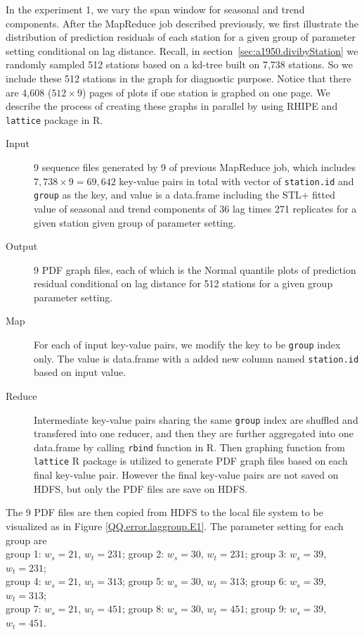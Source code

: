 In the experiment 1, we vary the span window for seasonal and trend components. 
After the MapReduce job described previously, we first illustrate the distribution
of prediction residuals of each station for a given group of parameter setting
conditional on lag distance. Recall, in section~\ref{sec:a1950.divibyStation} we
randomly sampled 512 stations based on a kd-tree built on 7,738 stations. So we 
include these 512 stations in the graph for diagnostic purpose. Notice that there
are 4,608 ($512 \times 9$) pages of plots if one station is graphed on one page.
We describe the process of creating these graphs in parallel by using RHIPE and 
\texttt{lattice} package in R.

\begin{description}
  \item[Input] 9 sequence files generated by 9 of previous MapReduce job, which 
  includes $7,738 \times 9 = 69,642$ key-value pairs in total with vector of 
  \texttt{station.id} and \texttt{group} as the key, and value is a data.frame 
  including the STL+ fitted value of seasonal and trend components of 36 lag 
  times 271 replicates for a given station given group of parameter setting.
  \item[Output] 9 PDF graph files, each of which is the Normal quantile plots of
  prediction residual conditional on lag distance for 512 stations for a given
  group parameter setting.  
  \item[Map] For each of input key-value pairs, we modify the key to be 
  \texttt{group} index only. The value is data.frame with a added new column 
  named \texttt{station.id} based on input value.
  \item[Reduce] Intermediate key-value pairs sharing the same \texttt{group} 
  index are shuffled and transfered into one reducer, and then they are further 
  aggregated into one data.frame by calling \texttt{rbind} 
  function in R. Then graphing function from \texttt{lattice} R package is utilized
  to generate PDF graph files based on each final key-value pair. However the 
  final key-value pairs are not saved on HDFS, but only the PDF files are save on
  HDFS. 
\end{description} 

The 9 PDF files are then copied from HDFS to the local file system to be 
visualized as in Figure {\ref{QQ.error.laggroup.E1}}. The parameter setting for
each group are
\\
group 1: $w_s = 21$, $w_t = 231$;
group 2: $w_s = 30$, $w_t = 231$;
group 3: $w_s = 39$, $w_t = 231$;\\
group 4: $w_s = 21$, $w_t = 313$;
group 5: $w_s = 30$, $w_t = 313$;
group 6: $w_s = 39$, $w_t = 313$;\\
group 7: $w_s = 21$, $w_t = 451$;
group 8: $w_s = 30$, $w_t = 451$;
group 9: $w_s = 39$, $w_t = 451$.
\\

